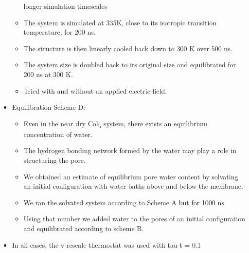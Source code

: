 \documentclass{article}
\begin{document}
\begin{itemize}
\begin{itemize}
          longer simulation timescales
          \item The system is simulated at 335K, close to its isotropic transition temperature, for 200 ns. %
          \item The structure is then linearly cooled back down to 300 K over 500 ns. 
          \item The system size is doubled back to its original size and equilibrated for 200 ns at 300 K.
          \item Tried with and without an applied electric field.
      \end{itemize}
      \item Equilibration Scheme D:
      \begin{itemize}
          \item Even in the near dry Col\textsubscript{h} system, there exists an
          equilibrium concentration of water.
          \item The hydrogen bonding network formed by the water may play a role 
          in structuring the pore.
          \item We obtained an estimate of equilibrium pore water content by solvating
          an initial configuration with water baths above and below the membrane. 
	  \item We ran the solvated system according to Scheme A but for 1000 ns
          \item Using that number we added water to the pores of an initial 
	  configuration and equilibrated according to scheme B. 
      \end{itemize}
      \item In all cases, the v-rescale thermostat was used with tau-t = 0.1
  \end{itemize}
\end{document}
